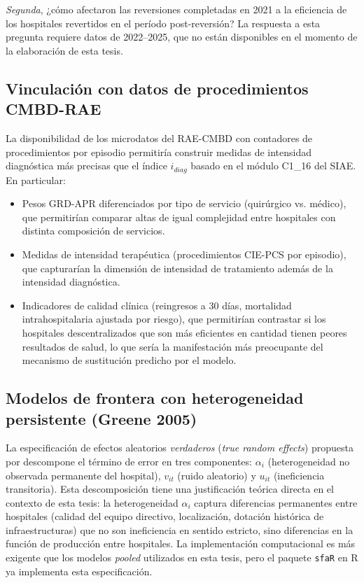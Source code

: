 \textit{Segunda}, ¿cómo afectaron las reversiones completadas en 2021 a la eficiencia de los hospitales revertidos en el período post-reversión? La respuesta a esta pregunta requiere datos de 2022--2025, que no están disponibles en el momento de la elaboración de esta tesis.

\subsection{Vinculación con datos de procedimientos CMBD-RAE}

La disponibilidad de los microdatos del RAE-CMBD con contadores de procedimientos por episodio permitiría construir medidas de intensidad diagnóstica más precisas que el índice $i_{diag}$ basado en el módulo C1\_16 del SIAE. En particular:

\begin{itemize}
  \item Pesos GRD-APR diferenciados por tipo de servicio (quirúrgico vs. médico), que permitirían comparar altas de igual complejidad entre hospitales con distinta composición de servicios.
  \item Medidas de intensidad terapéutica (procedimientos CIE-PCS por episodio), que capturarían la dimensión de intensidad de tratamiento además de la intensidad diagnóstica.
  \item Indicadores de calidad clínica (reingresos a 30 días, mortalidad intrahospitalaria ajustada por riesgo), que permitirían contrastar si los hospitales descentralizados que son más eficientes en cantidad tienen peores resultados de salud, lo que sería la manifestación más preocupante del mecanismo de sustitución predicho por el modelo.
\end{itemize}

\subsection{Modelos de frontera con heterogeneidad persistente (Greene 2005)}

La especificación de efectos aleatorios \textit{verdaderos} (\textit{true random effects}) propuesta por \citet{greene2005a} descompone el término de error en tres componentes: $\alpha_i$ (heterogeneidad no observada permanente del hospital), $v_{it}$ (ruido aleatorio) y $u_{it}$ (ineficiencia transitoria). Esta descomposición tiene una justificación teórica directa en el contexto de esta tesis: la heterogeneidad $\alpha_i$ captura diferencias permanentes entre hospitales (calidad del equipo directivo, localización, dotación histórica de infraestructuras) que no son ineficiencia en sentido estricto, sino diferencias en la función de producción entre hospitales. La implementación computacional es más exigente que los modelos \textit{pooled} utilizados en esta tesis, pero el paquete \texttt{sfaR} en R ya implementa esta especificación.

